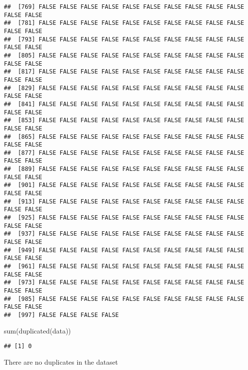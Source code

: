 \documentclass[
]{article}
\newenvironment{Shaded}{\begin{snugshade}}{\end{snugshade}}
\newcommand{\DocumentationTok}[1]{\textcolor[rgb]{0.56,0.35,0.01}{\textbf{\textit{#1}}}}
\newcommand{\FunctionTok}[1]{\textcolor[rgb]{0.00,0.00,0.00}{#1}}
\newcommand{\NormalTok}[1]{#1}
\newcommand{\SpecialCharTok}[1]{\textcolor[rgb]{0.00,0.00,0.00}{#1}}
\begin{document}
\begin{verbatim}
##  [769] FALSE FALSE FALSE FALSE FALSE FALSE FALSE FALSE FALSE FALSE FALSE FALSE
##  [781] FALSE FALSE FALSE FALSE FALSE FALSE FALSE FALSE FALSE FALSE FALSE FALSE
##  [793] FALSE FALSE FALSE FALSE FALSE FALSE FALSE FALSE FALSE FALSE FALSE FALSE
##  [805] FALSE FALSE FALSE FALSE FALSE FALSE FALSE FALSE FALSE FALSE FALSE FALSE
##  [817] FALSE FALSE FALSE FALSE FALSE FALSE FALSE FALSE FALSE FALSE FALSE FALSE
##  [829] FALSE FALSE FALSE FALSE FALSE FALSE FALSE FALSE FALSE FALSE FALSE FALSE
##  [841] FALSE FALSE FALSE FALSE FALSE FALSE FALSE FALSE FALSE FALSE FALSE FALSE
##  [853] FALSE FALSE FALSE FALSE FALSE FALSE FALSE FALSE FALSE FALSE FALSE FALSE
##  [865] FALSE FALSE FALSE FALSE FALSE FALSE FALSE FALSE FALSE FALSE FALSE FALSE
##  [877] FALSE FALSE FALSE FALSE FALSE FALSE FALSE FALSE FALSE FALSE FALSE FALSE
##  [889] FALSE FALSE FALSE FALSE FALSE FALSE FALSE FALSE FALSE FALSE FALSE FALSE
##  [901] FALSE FALSE FALSE FALSE FALSE FALSE FALSE FALSE FALSE FALSE FALSE FALSE
##  [913] FALSE FALSE FALSE FALSE FALSE FALSE FALSE FALSE FALSE FALSE FALSE FALSE
##  [925] FALSE FALSE FALSE FALSE FALSE FALSE FALSE FALSE FALSE FALSE FALSE FALSE
##  [937] FALSE FALSE FALSE FALSE FALSE FALSE FALSE FALSE FALSE FALSE FALSE FALSE
##  [949] FALSE FALSE FALSE FALSE FALSE FALSE FALSE FALSE FALSE FALSE FALSE FALSE
##  [961] FALSE FALSE FALSE FALSE FALSE FALSE FALSE FALSE FALSE FALSE FALSE FALSE
##  [973] FALSE FALSE FALSE FALSE FALSE FALSE FALSE FALSE FALSE FALSE FALSE FALSE
##  [985] FALSE FALSE FALSE FALSE FALSE FALSE FALSE FALSE FALSE FALSE FALSE FALSE
##  [997] FALSE FALSE FALSE FALSE
\end{verbatim}

\begin{Shaded}
\begin{Highlighting}[]
\FunctionTok{sum}\NormalTok{(}\FunctionTok{duplicated}\NormalTok{(data))}
\end{Highlighting}
\end{Shaded}

\begin{verbatim}
## [1] 0
\end{verbatim}

There are no duplicates in the dataset

\begin{Shaded}
\end{Shaded}
\end{document}
